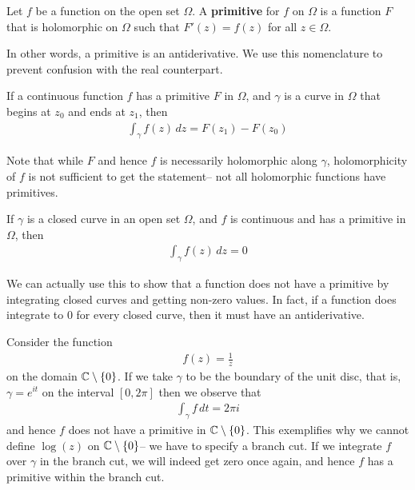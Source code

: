 \documentclass{memoir}
\begin{document}
\begin{defn}[Primitive]
	Let \(f\) be a function on the open set \(\Omega\). A \textbf{primitive} for \(f\) on \(\Omega\) is a function \(F\) that is holomorphic on \(\Omega\) such that \(F'(z) = f(z)\) for all \(z \in \Omega\).
\end{defn}
In other words, a primitive is an antiderivative. We use this nomenclature to prevent confusion with the real counterpart.

\begin{thm}
	If a continuous function \(f\) has a primitive \(F\) in \(\Omega\), and \(\gamma\) is a curve in \(\Omega\) that begins at \(z_0\) and ends at \(z_1\), then
	\begin{align*}
		\int_{\gamma} f(z) \,d z = F(z_1)-F(z_0)
	\end{align*}
\end{thm}
Note that while \(F\) and hence \(f\) is necessarily holomorphic along \(\gamma \), holomorphicity of \(f\) is not sufficient to get the statement-- not all holomorphic functions have primitives.

\begin{cor}
	If \(\gamma\) is a closed curve in an open set \(\Omega\), and \(f\) is continuous and has a primitive in \(\Omega\), then
	\begin{align*}
		\int_{\gamma} f(z) \,d z = 0 
	\end{align*}
\end{cor}
We can actually use this to show that a function does not have a primitive by integrating closed curves and getting non-zero values. In fact, if a function does integrate to \(0\) for every closed curve, then it must have an antiderivative.

\begin{exmp}
	Consider the function
	\begin{align*}
		f(z) = \frac{1}{z}
	\end{align*}
	on the domain \(\mathbb{C}\setminus \left\{ 0 \right\} \). If we take \(\gamma \) to be the boundary of the unit disc, that is, \(\gamma  = e^{it}\) on the interval \([0,2\pi ]\) then we observe that
	\begin{align*}
		\int_{\gamma } f \,d t = 2\pi i
	\end{align*}
	and hence \(f\) does not have a primitive in \(\mathbb{C}\setminus\left\{ 0 \right\} \). This exemplifies why we cannot define \(\log(z)\) on \(\mathbb{C}\setminus\left\{ 0 \right\} \)-- we have to specify a branch cut. If we integrate \(f\) over \(\gamma \) in the branch cut, we will indeed get zero once again, and hence \(f\) has a primitive within the branch cut.
\end{exmp}
\end{document}
